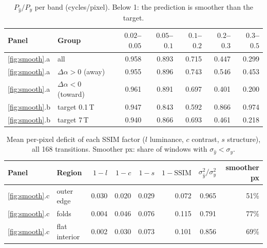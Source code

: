 \documentclass[10pt,a4paper]{article}
\newcommand{\da}{\Delta\alpha}
\begin{document}
\begin{table}[H]
\centering\small
\begin{tabular}{llrrrrr}
\toprule
Panel & Group & $0.02$--$0.05$ & $0.05$--$0.1$ & $0.1$--$0.2$ & $0.2$--$0.3$ & $0.3$--$0.5$ \\
\midrule
\ref{fig:smooth}.a & all              & 0.958 & 0.893 & 0.715 & 0.447 & 0.299 \\
\ref{fig:smooth}.a & $\da>0$ (away)   & 0.955 & 0.896 & 0.743 & 0.546 & 0.453 \\
\ref{fig:smooth}.a & $\da<0$ (toward) & 0.961 & 0.891 & 0.697 & 0.401 & 0.200 \\
\ref{fig:smooth}.b & target 0.1\,T    & 0.947 & 0.843 & 0.592 & 0.866 & 0.974 \\
\ref{fig:smooth}.b & target 7\,T      & 0.940 & 0.866 & 0.693 & 0.461 & 0.218 \\
\bottomrule
\end{tabular}
\caption{$P_{\hat y}/P_y$ per band (cycles/pixel). Below 1: the prediction is smoother than
the target.}
\label{tab:smooth}
\end{table}

\begin{table}[H]
\centering\small
\begin{tabular}{llrrrrrr}
\toprule
Panel & Region & $1-l$ & $1-c$ & $1-s$ & $1-\mathrm{SSIM}$ & $\sigma^2_{\hat y}/\sigma^2_y$
      & smoother px \\
\midrule
\ref{fig:smooth}.c & outer edge    & 0.030 & 0.020 & 0.029 & 0.072 & 0.965 & 51\% \\
\ref{fig:smooth}.c & folds         & 0.004 & 0.046 & 0.076 & 0.115 & 0.791 & 77\% \\
\ref{fig:smooth}.c & flat interior & 0.002 & 0.030 & 0.073 & 0.101 & 0.856 & 69\% \\
\bottomrule
\end{tabular}
\caption{Mean per-pixel deficit of each SSIM factor ($l$ luminance, $c$ contrast, $s$
structure), all 168 transitions. Smoother px: share of windows with
$\sigma_{\hat y} < \sigma_y$.}
\label{tab:factors}
\end{table}
\end{document}
